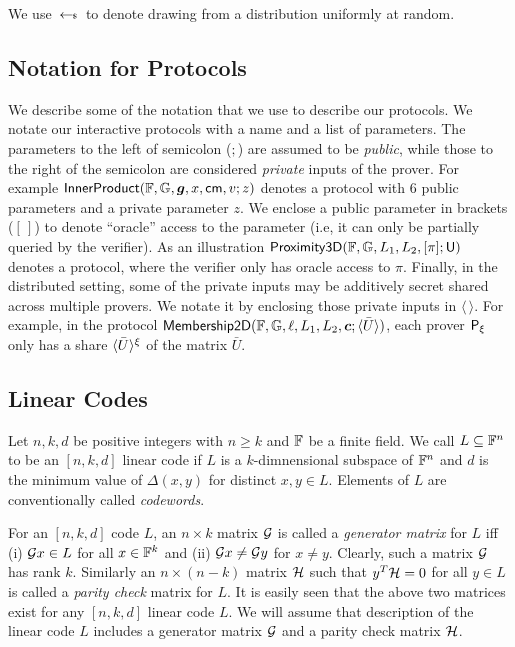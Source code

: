 We use $\hskip2.3pt{\gets\!\!\mbox{\tiny${\$}$\normalsize}}\,$ to denote drawing from a distribution uniformly at random.  

\subsection{Notation for Protocols}
We describe some of the notation that we use to describe our protocols. We
notate our interactive protocols with a name and a list of parameters. The
parameters to the left of semicolon ($;$) are assumed to be {\em public}, while those to the
right of the semicolon are considered {\em private} inputs of the prover. For example
$\mathsf{InnerProduct}(\mathbb{F},\mathbb{G},\bm{g},x,\mathsf{cm},v;z)$ denotes a protocol with $6$
public parameters and a private parameter $z$. We enclose a public parameter in
brackets ($[\,]$) to denote ``oracle'' access to the parameter (i.e, it can only
be partially queried by the verifier). As an illustration
$\mathsf{Proximity3D}(\mathbb{F},\mathbb{G},L_1,L_2,[\pi];\mathsf{U})$ denotes a protocol, where the
verifier only has oracle access to $\pi$. Finally, in the distributed setting,
some of the private inputs may be additively secret shared  across multiple provers. We notate it
by enclosing those private inputs in $\langle\,\rangle$. For example, in the protocol
$\mathsf{Membership2D}(\mathbb{F},\mathbb{G},\ell,L_1,L_2,\bm{c};\langle \bar{U} \rangle)$, each prover
$\mathsf{P}_\xi$ only has a share $\langle{\bar{U}}\rangle^\xi$ of the matrix $\bar{U}$.

\subsection{Linear Codes}
\begin{definition}\label{defn:lincode}
Let $n,k,d$ be positive integers with $n\geq k$ and $\mathbb{F}$ be a finite field. We
call $L\subseteq \mathbb{F}^n$ to be an $[n,k,d]$ linear code if $L$ is a $k$-dimnensional
subspace of $\mathbb{F}^n$ and $d$ is the minimum value of $\Delta(x,y)$ for distinct
$x,y\in L$. Elements of $L$ are conventionally called {\em codewords}.
\end{definition}

For an $[n,k,d]$ code $L$, an $n\times k$ matrix $\mathcal{G}$ is called a {\em
generator matrix} for $L$ iff (i) $\mathcal{G} x\in L$ for all $x \in \mathbb{F}^k$ and (ii)
$\mathcal{G} x\neq \mathcal{G} y$ for $x\neq y$. Clearly, such a matrix $\mathcal{G}$ has rank
$k$. Similarly an $n\times (n-k)$ matrix $\mathcal{H}$ such that $y^T \mathcal{H} = 0$ for
all $y\in L$ is called a {\em parity check} matrix for $L$. It is easily seen
that the above two matrices exist for any $[n,k,d]$ linear code $L$. We will
assume that description of the linear code $L$ includes a generator matrix
$\mathcal{G}$ and a parity check matrix $\mathcal{H}$.

